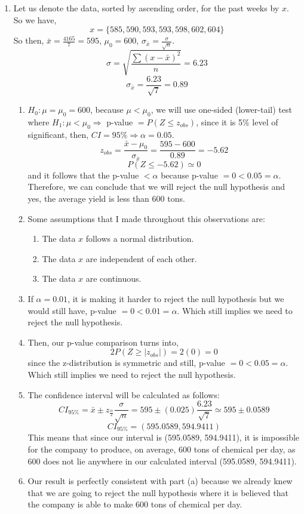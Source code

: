 \documentclass[12pt]{article}
\begin{document}
\begin{enumerate}
\begin{proof}
			$\therefore$ We have shown that $X$ and $Y$ are dependent, but they have zero covariance.
		\end{proof}
		\item Let us denote the data, sorted by ascending order, for the past weeks by $x$. So we have, 
		$$x = \{585, 590, 593, 593, 598, 602, 604\}$$
		So then, $\bar{x} = \frac{4165}{7} = 595$, $\mu_0 = 600$, $\sigma_{\bar{x}} = \frac{\sigma}{\sqrt{n}}$.
		$$\sigma = \sqrt{\frac{\sum (x - \bar{x})^2}{n}} = 6.23$$
		$$\sigma_{\bar{x}} = \frac{6.23}{\sqrt{7}} = 0.89$$
		\begin{enumerate}
			\item $H_0 : \mu = \mu_0 = 600$, because $\mu < \mu_0$, we will use one-sided (lower-tail) test where $H_1 : \mu < \mu_0 \Rightarrow$ p-value $= P(Z \leq z_{obs})$, since it is 5\% level of significant, then, $CI = 95\% \Rightarrow \alpha = 0.05$.
				$$z_{obs} = \frac{\bar{x} - \mu_0}{\sigma_{\bar{x}}} = \frac{595 - 600}{0.89} = -5.62$$
				$$P(Z \leq -5.62) \simeq 0$$
				and it follows that the p-value $< \alpha$ because p-value $= 0 < 0.05 = \alpha$. Therefore, we can conclude that we will reject the null hypothesis and yes, the average yield is less than 600 tons.
			\item Some assumptions that I made throughout this observations are:
				\begin{enumerate}
					\item The data $x$ follows a normal distribution.
					\item The data $x$ are independent of each other.
					\item The data $x$ are continuous.
				\end{enumerate}
			\item If $\alpha = 0.01$, it is making it harder to reject the null hypothesis but we would still have, p-value $= 0 < 0.01 = \alpha$. Which still implies we need to reject the null hypothesis.
			\item Then, our p-value comparison turns into,
			$$2P(Z \geq |z_{obs}|) = 2(0) = 0$$
			since the z-distribution is symmetric and still, p-value $= 0 < 0.05 = \alpha$. Which still implies we need to reject the null hypothesis.
			\item The confidence interval will be calculated as follows:
			$$CI_{95\%} = \bar{x} \pm z_{\frac{\alpha}{2}} \frac{\sigma}{\sqrt{n}} = 595 \pm (0.025)\frac{6.23}{\sqrt{7}} \simeq 595 \pm 0.0589$$
			$$CI_{95\%} = (595.0589, 594.9411)$$
			This means that since our interval is (595.0589, 594.9411), it is impossible for the company to produce, on average, 600 tons of chemical per day, as 600 does not lie anywhere in our calculated interval (595.0589, 594.9411).
			\item Our result is perfectly consistent with part (a) because we already knew that we are going to reject the null hypothesis where it is believed that the company is able to make 600 tons of chemical per day.
		\end{enumerate}
\end{enumerate}
\end{document}
